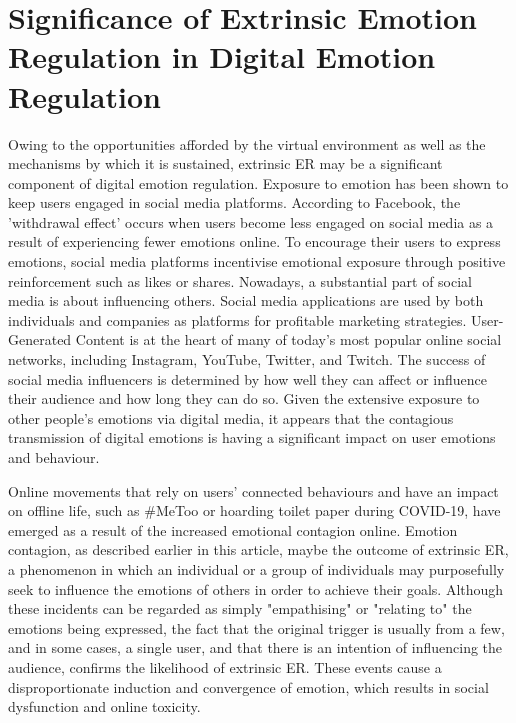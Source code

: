 \documentclass[lettersize,journal]{IEEEtran}
\begin{document}
\section{Significance of Extrinsic Emotion Regulation in Digital Emotion Regulation}
Owing to the opportunities afforded by the virtual environment as well as the mechanisms by which it is sustained, extrinsic ER may be a significant component of digital emotion regulation. Exposure to emotion has been shown to keep users engaged in social media platforms. According to Facebook, the 'withdrawal effect' occurs when users become less engaged on social media as a result of experiencing fewer emotions online. To encourage their users to express emotions, social media platforms incentivise emotional exposure through positive reinforcement such as likes or shares. Nowadays, a substantial part of social media is about influencing others. Social media applications are used by both individuals and companies as platforms for profitable marketing strategies. User-Generated Content is at the heart of many of today's most popular online social networks, including Instagram, YouTube, Twitter, and Twitch. The success of social media influencers is determined by how well they can affect or influence their audience and how long they can do so. Given the extensive exposure to other people's emotions via digital media, it appears that the contagious transmission of digital emotions is having a significant impact on user emotions and behaviour.

Online movements that rely on users' connected behaviours and have an impact on offline life, such as \#MeToo or hoarding toilet paper during COVID-19, have emerged as a result of the increased emotional contagion online. Emotion contagion, as described earlier in this article, maybe the outcome of extrinsic ER, a phenomenon in which an individual or a group of individuals may purposefully seek to influence the emotions of others in order to achieve their goals. Although these incidents can be regarded as simply "empathising" or "relating to" the emotions being expressed, the fact that the original trigger is usually from a few, and in some cases, a single user, and that there is an intention of influencing the audience, confirms the likelihood of extrinsic ER. These events cause a disproportionate induction and convergence of emotion, which results in social dysfunction and online toxicity.
 
\end{document}
